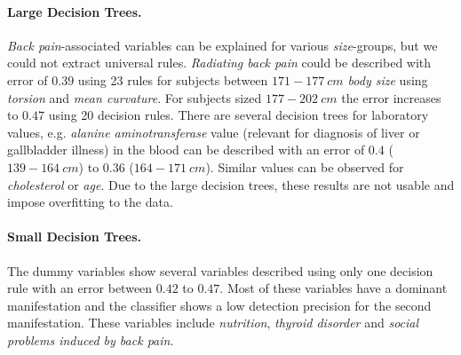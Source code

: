 \documentclass[a4paper,twoside]{style/article}
\newcommand{\com}[1]{\textcolor{orange}{\uline{#1}}}
\begin{document}
\paragraph{Large Decision Trees. }
\emph{Back pain}-associated variables can be explained for various \emph{size}-groups, but we could not extract universal rules.
\emph{Radiating back pain} could be described with error of $0.39$ using 23 rules for subjects between \emph{$171-177~cm$ body size} using \emph{torsion} and \emph{mean curvature}.
For subjects sized \emph{$177-202~cm$} the error increases to $0.47$ using 20 decision rules.
There are several decision trees for laboratory values, e.g. \emph{alanine aminotransferase} value (relevant for diagnosis of liver or gallbladder illness) in the blood can be described with an error of $0.4$ (\emph{$139-164~cm$}) to $0.36$ (\emph{$164 - 171~cm$}).
Similar values can be observed for \emph{cholesterol} or \emph{age}.
Due to the large decision trees, these results are not usable and impose overfitting to the data.
\paragraph{Small Decision Trees. }
The dummy variables show several variables described using only one decision rule with an error between $0.42$ to $0.47$.
Most of these variables have a dominant manifestation and the classifier shows a low detection precision for the second manifestation.
These variables include \emph{nutrition}, \emph{thyroid disorder} and \emph{social problems induced by back pain}.



\end{document}
